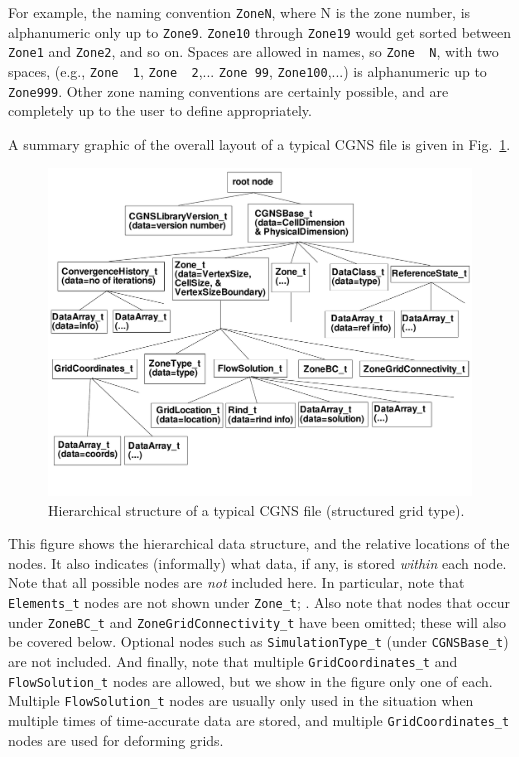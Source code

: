 \documentclass[12pt]{article}
\begin{document}
For example, the naming convention {\tt ZoneN}, where N is the zone
number, is alphanumeric only up to {\tt Zone9}.  {\tt Zone10} through
{\tt Zone19} would get sorted between {\tt Zone1} and {\tt Zone2}, and so on.
Spaces are allowed in names, so {\tt Zone~~N}, with two spaces, 
(e.g., {\tt Zone~~1}, {\tt Zone~~2},...
{\tt Zone~99}, {\tt Zone100},...) is alphanumeric up to {\tt Zone999}.  Other
zone naming conventions are certainly possible, and are completely
up to the user to define appropriately.

A summary graphic of the overall layout of a typical CGNS file 
is given in Fig.~\ref{FIGoverviewSTR}.  
\begin{figure}[hpbt]
\centerline{{\includegraphics[width=150mm]{figures/overviewSTR}}}
\caption{Hierarchical structure of a typical CGNS file (structured
grid type).}
\label{FIGoverviewSTR}
\end{figure}
%
This figure shows the hierarchical data structure,
and the relative locations of the nodes.  It also indicates
(informally) what data, if any, is stored {\it within} each node.
Note that all possible nodes are {\it not}
included here.  In particular, note that {\tt Elements\_t} nodes are
not shown under {\tt Zone\_t}; 
.  
Also note that nodes that occur
under {\tt ZoneBC\_t} and {\tt ZoneGridConnectivity\_t} have been omitted;
these will also be covered below.  Optional nodes such as 
{\tt SimulationType\_t} (under {\tt CGNSBase\_t}) are not included.  And finally, note that
multiple {\tt GridCoordinates\_t} and {\tt FlowSolution\_t} nodes are allowed, 
but we show in the figure only one of each.  
Multiple {\tt FlowSolution\_t} nodes are usually only used in
the situation when multiple times of time-accurate data are
stored, and multiple {\tt GridCoordinates\_t} nodes are used
for deforming grids.
\end{document}
